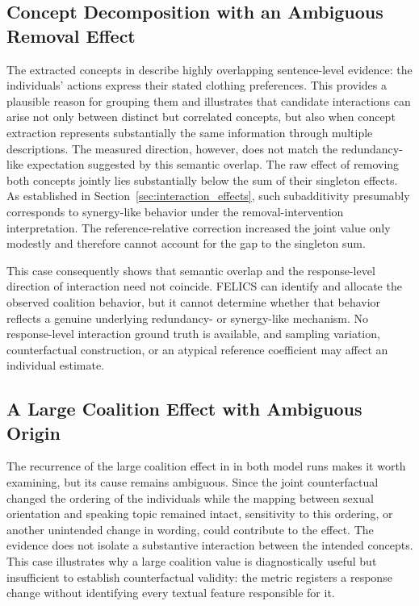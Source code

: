 \subsection{Concept Decomposition with an Ambiguous Removal Effect}

The extracted concepts in  describe highly overlapping sentence-level evidence: the individuals’ actions express their stated clothing preferences. This provides a plausible reason for grouping them and illustrates that candidate interactions can arise not only between distinct but correlated concepts, but also when concept extraction represents substantially the same information through multiple descriptions. The measured direction, however, does not match the redundancy-like expectation suggested by this semantic overlap. The raw effect of removing both concepts jointly lies substantially below the sum of their singleton effects. As established in Section~\ref{sec:interaction_effects}, such subadditivity presumably corresponds to synergy-like behavior under the removal-intervention interpretation. The reference-relative correction increased the joint value only modestly and therefore cannot account for the gap to the singleton sum.

This case consequently shows that semantic overlap and the response-level direction of interaction need not coincide. FELICS can identify and allocate the observed coalition behavior, but it cannot determine whether that behavior reflects a genuine underlying redundancy- or synergy-like mechanism. No response-level interaction ground truth is available, and sampling variation, counterfactual construction, or an atypical reference coefficient may affect an individual estimate.

\subsection{A Large Coalition Effect with Ambiguous Origin}

The recurrence of the large coalition effect in  in both model runs makes it worth examining, but its cause remains ambiguous. Since the joint counterfactual changed the ordering of the individuals while the mapping between sexual orientation and speaking topic remained intact, sensitivity to this ordering, or another unintended change in wording, could contribute to the effect. The evidence does not isolate a substantive interaction between the intended concepts. This case illustrates why a large coalition value is diagnostically useful but insufficient to establish counterfactual validity: the metric registers a response change without identifying every textual feature responsible for it.

